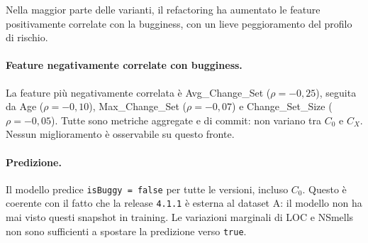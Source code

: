 Nella maggior parte delle varianti, il refactoring ha aumentato le feature positivamente
correlate con la bugginess, con un lieve peggioramento del profilo di rischio.

\paragraph{Feature negativamente correlate con bugginess.}
La feature più negativamente correlata è Avg\_Change\_Set ($\rho = -0{,}25$), seguita
da Age ($\rho = -0{,}10$), Max\_Change\_Set ($\rho = -0{,}07$) e Change\_Set\_Size
($\rho = -0{,}05$). Tutte sono metriche aggregate e di commit: non variano tra $C_0$ e $C_X$.
Nessun miglioramento è osservabile su questo fronte.

\paragraph{Predizione.}
Il modello predice \texttt{isBuggy = false} per tutte le versioni, incluso $C_0$.
Questo è coerente con il fatto che la release \texttt{4.1.1} è esterna al dataset A:
il modello non ha mai visto questi snapshot in training. Le variazioni marginali di LOC
e NSmells non sono sufficienti a spostare la predizione verso \texttt{true}.
